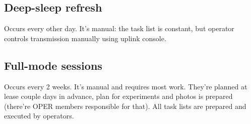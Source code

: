 \subsection{Deep-sleep refresh}
Occurs every other day. It's manual: the task list is constant, but operator controls transmission manually using uplink console.

\subsection{Full-mode sessions}
Occurs every 2 weeks. It's manual and requires most work. They're planned at lease couple days in advance, plan for experiments and photos is prepared (there're OPER members responsible for that). All task lists are prepared and executed by operators.